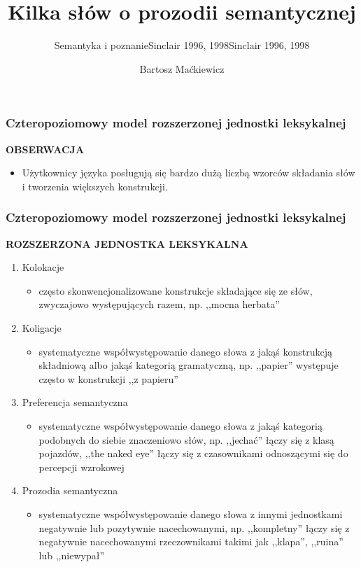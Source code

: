 \documentclass[11pt]{beamer}
\title{Kilka słów o prozodii semantycznej}
\subtitle{Semantyka i poznanie}
\author{Bartosz Maćkiewicz}
\institute{Laboatorium Filozofii Eksperymentalnej KogniLab}
\date{}
\begin{document}
\begin{frame}
\titlepage
\end{frame}

\begin{frame}
  \frametitle{Czteropoziomowy model rozszerzonej jednostki leksykalnej}
  \subtitle{Sinclair 1996, 1998}
  \textbf{OBSERWACJA}
  \begin{itemize}
	\item Użytkownicy języka posługują się bardzo dużą liczbą wzorców składania słów i tworzenia większych konstrukcji.
\end{itemize}
\end{frame}

\begin{frame}
  \frametitle{Czteropoziomowy model rozszerzonej jednostki leksykalnej}
  \subtitle{Sinclair 1996, 1998}
\textbf{ROZSZERZONA JEDNOSTKA LEKSYKALNA}
\begin{enumerate}
	\item Kolokacje
    \begin{itemize}
    \item często skonwencjonalizowane konstrukcje składające się ze słów, zwyczajowo występujących razem, np. ,,mocna herbata''
    \end{itemize}
	\item Koligacje
    \begin{itemize}
    \item systematyczne współwystępowanie danego słowa z jakąś konstrukcją składniową albo jakąś kategorią gramatyczną, np. ,,papier'' występuje często w konstrukcji ,,z papieru''
    \end{itemize}
	\item Preferencja semantyczna
    \begin{itemize}
    \item systematyczne współwystępowanie danego słowa z jakąś kategorią podobnych do siebie znaczeniowo słów, np. ,,jechać'' łączy się z klasą pojazdów, ,,the naked eye'' łączy się z czasownikami odnoszącymi się do percepcji wzrokowej
    \end{itemize}
	\item Prozodia semantyczna
    \begin{itemize}
    \item systematyczne współwystępowanie danego słowa z innymi jednostkami negatywnie lub pozytywnie nacechowanymi, np. ,,kompletny'' łączy się z negatywnie nacechowanymi rzeczownikami takimi jak ,,klapa'', ,,ruina'' lub ,,niewypał''
    \end{itemize}
\end{enumerate}
\end{frame}
\end{document}
